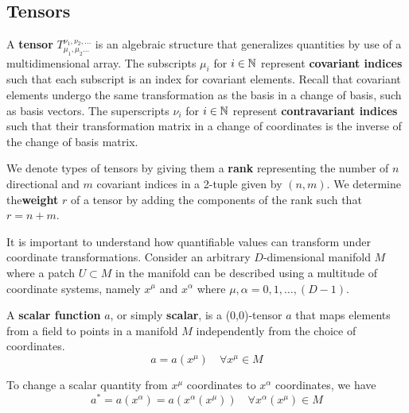 \documentclass{article}
\begin{document}
 	\subsection{Tensors}
 		\begin{defn}
 			A \textbf{tensor} $T_{\mu_1, \mu_2 \dots}^{\nu_1, \nu_2, \dots}$ is an algebraic structure that generalizes quantities by use of a multidimensional array. The subscripts $\mu_i$ for $i \in \mathbb{N}$ represent \textbf{covariant indices} such that each subscript is an index for covariant elements. Recall that covariant elements undergo the same transformation as the basis in a change of basis, such as basis vectors. The superscripts $\nu_i$ for $i \in \mathbb{N}$ represent \textbf{contravariant indices} such that their transformation matrix in a change of coordinates is the inverse of the change of basis matrix.
 		\end{defn}
 		\begin{defn}
 			We denote types of tensors by giving them a \textbf{rank} representing the number of $n$ directional and $m$ covariant indices in a 2-tuple given by $(n,m)$. We determine the\textbf{weight} $r$ of a tensor by adding the components of the rank such that $r=n+m$.
 		\end{defn}
 		It is important to understand how quantifiable values can transform under coordinate transformations. Consider an arbitrary $D$-dimensional manifold $M$ where a patch $U \subset M$ in the manifold can be described using a multitude of coordinate systems, namely $x^\mu$ and $x^\alpha$ where $\mu,\alpha = 0,1,\dots,(D-1)$.
 		
 		\begin{defn}
 			A \textbf{scalar function} $a$, or simply \textbf{scalar}, is a (0,0)-tensor $a$ that maps elements from a field to points in a manifold $M$ independently from the choice of coordinates.
 			$$ a = a(x^\mu) \quad \forall x^\mu \in M$$
 		\end{defn} \noindent
 		To change a scalar quantity from $x^\mu$ coordinates to $x^\alpha$ coordinates, we have
 		$$ a^* = a \left( x^\alpha \right) = a\left( x^\alpha (x^\mu) \right) \quad \forall x^\alpha (x^\mu) \in M$$
 		
\end{document}
